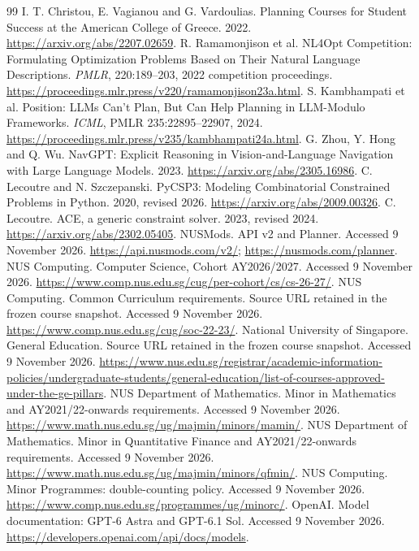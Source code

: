 \documentclass[11pt,a4paper]{article}
\begin{document}
\clearpage
\begin{thebibliography}{99}
 I. T. Christou, E. Vagianou and G. Vardoulias. Planning Courses for Student Success at the American College of Greece. 2022. \url{https://arxiv.org/abs/2207.02659}.
 R. Ramamonjison et al. NL4Opt Competition: Formulating Optimization Problems Based on Their Natural Language Descriptions. \emph{PMLR}, 220:189--203, 2022 competition proceedings. \url{https://proceedings.mlr.press/v220/ramamonjison23a.html}.
 S. Kambhampati et al. Position: LLMs Can't Plan, But Can Help Planning in LLM-Modulo Frameworks. \emph{ICML}, PMLR 235:22895--22907, 2024. \url{https://proceedings.mlr.press/v235/kambhampati24a.html}.
 G. Zhou, Y. Hong and Q. Wu. NavGPT: Explicit Reasoning in Vision-and-Language Navigation with Large Language Models. 2023. \url{https://arxiv.org/abs/2305.16986}.
 C. Lecoutre and N. Szczepanski. PyCSP3: Modeling Combinatorial Constrained Problems in Python. 2020, revised 2026. \url{https://arxiv.org/abs/2009.00326}.
 C. Lecoutre. ACE, a generic constraint solver. 2023, revised 2024. \url{https://arxiv.org/abs/2302.05405}.
 NUSMods. API v2 and Planner. Accessed 9 November 2026. \url{https://api.nusmods.com/v2/}; \url{https://nusmods.com/planner}.
 NUS Computing. Computer Science, Cohort AY2026/2027. Accessed 9 November 2026. \url{https://www.comp.nus.edu.sg/cug/per-cohort/cs/cs-26-27/}.
 NUS Computing. Common Curriculum requirements. Source URL retained in the frozen course snapshot. Accessed 9 November 2026. \url{https://www.comp.nus.edu.sg/cug/soc-22-23/}.
 National University of Singapore. General Education. Source URL retained in the frozen course snapshot. Accessed 9 November 2026. \url{https://www.nus.edu.sg/registrar/academic-information-policies/undergraduate-students/general-education/list-of-courses-approved-under-the-ge-pillars}.
 NUS Department of Mathematics. Minor in Mathematics and AY2021/22-onwards requirements. Accessed 9 November 2026. \url{https://www.math.nus.edu.sg/ug/majmin/minors/mamin/}.
 NUS Department of Mathematics. Minor in Quantitative Finance and AY2021/22-onwards requirements. Accessed 9 November 2026. \url{https://www.math.nus.edu.sg/ug/majmin/minors/qfmin/}.
 NUS Computing. Minor Programmes: double-counting policy. Accessed 9 November 2026. \url{https://www.comp.nus.edu.sg/programmes/ug/minorc/}.
 OpenAI. Model documentation: GPT-6 Astra and GPT-6.1 Sol. Accessed 9 November 2026. \url{https://developers.openai.com/api/docs/models}.
\end{thebibliography}
\end{document}
